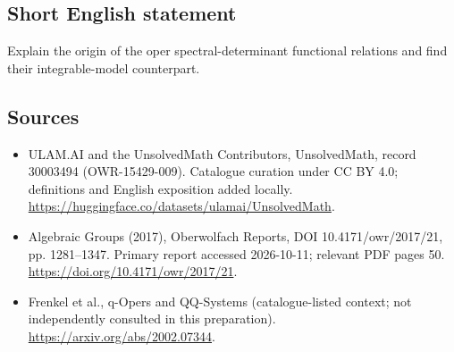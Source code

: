 \documentclass[11pt]{article}
\begin{document}
\subsection{Short English statement}
Explain the origin of the oper spectral-determinant functional relations and find their integrable-model counterpart.
\subsection{Sources}
\begin{itemize}
\item[\hypertarget{source:30003494:1}{S1}] ULAM.AI and the UnsolvedMath Contributors, UnsolvedMath, record 30003494 (OWR-15429-009). Catalogue curation under CC BY 4.0; definitions and English exposition added locally.
\url{https://huggingface.co/datasets/ulamai/UnsolvedMath}.
\item[\hypertarget{source:30003494:2}{S2}] Algebraic Groups (2017), Oberwolfach Reports, DOI 10.4171/owr/2017/21, pp. 1281--1347. Primary report accessed 2026-10-11; relevant PDF pages 50.
\url{https://doi.org/10.4171/owr/2017/21}.
\item[\hypertarget{source:30003494:3}{S3}] Frenkel et al., q-Opers and QQ-Systems (catalogue-listed context; not independently consulted in this preparation).
\url{https://arxiv.org/abs/2002.07344}.
\end{itemize}
\label{end:30003494}
\end{document}
